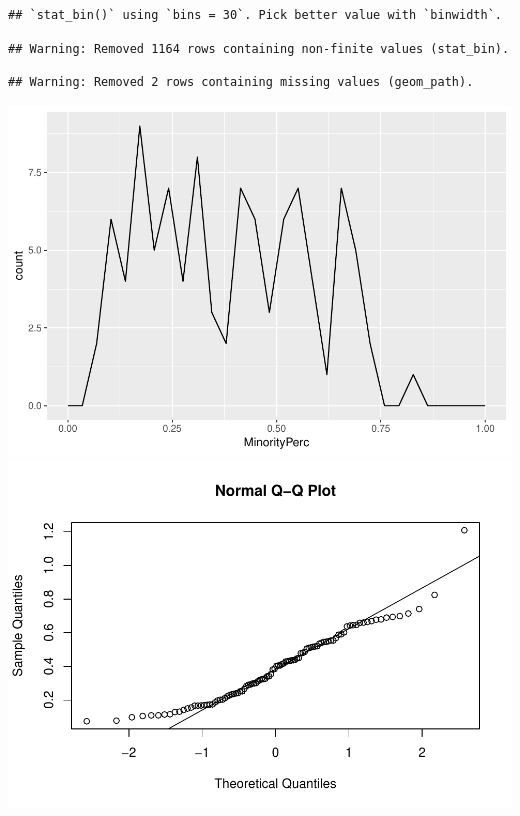 \documentclass[12pt,]{article}
\begin{document}
\begin{verbatim}
## `stat_bin()` using `bins = 30`. Pick better value with `binwidth`.
\end{verbatim}

\begin{verbatim}
## Warning: Removed 1164 rows containing non-finite values (stat_bin).
\end{verbatim}

\begin{verbatim}
## Warning: Removed 2 rows containing missing values (geom_path).
\end{verbatim}

\includegraphics{Townsend_Project_Template_files/figure-latex/exploratory graphs-1.pdf}
\includegraphics{Townsend_Project_Template_files/figure-latex/exploratory graphs-2.pdf}
\end{document}

